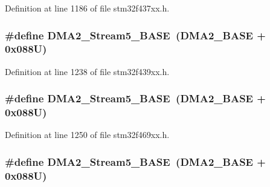 Definition at line 1186 of file stm32f437xx.\+h.

\subsubsection[{\texorpdfstring{D\+M\+A2\+\_\+\+Stream5\+\_\+\+B\+A\+SE}{DMA2_Stream5_BASE}}]{\setlength{\rightskip}{0pt plus 5cm}\#define D\+M\+A2\+\_\+\+Stream5\+\_\+\+B\+A\+SE~({\bf D\+M\+A2\+\_\+\+B\+A\+SE} + 0x088\+U)}\hypertarget{group___peripheral__memory__map_gaed1460fdc407b6decfbffccb0260d0af}{}\label{group___peripheral__memory__map_gaed1460fdc407b6decfbffccb0260d0af}


Definition at line 1238 of file stm32f439xx.\+h.

\subsubsection[{\texorpdfstring{D\+M\+A2\+\_\+\+Stream5\+\_\+\+B\+A\+SE}{DMA2_Stream5_BASE}}]{\setlength{\rightskip}{0pt plus 5cm}\#define D\+M\+A2\+\_\+\+Stream5\+\_\+\+B\+A\+SE~({\bf D\+M\+A2\+\_\+\+B\+A\+SE} + 0x088\+U)}\hypertarget{group___peripheral__memory__map_gaed1460fdc407b6decfbffccb0260d0af}{}\label{group___peripheral__memory__map_gaed1460fdc407b6decfbffccb0260d0af}


Definition at line 1250 of file stm32f469xx.\+h.

\subsubsection[{\texorpdfstring{D\+M\+A2\+\_\+\+Stream5\+\_\+\+B\+A\+SE}{DMA2_Stream5_BASE}}]{\setlength{\rightskip}{0pt plus 5cm}\#define D\+M\+A2\+\_\+\+Stream5\+\_\+\+B\+A\+SE~({\bf D\+M\+A2\+\_\+\+B\+A\+SE} + 0x088\+U)}\hypertarget{group___peripheral__memory__map_gaed1460fdc407b6decfbffccb0260d0af}{}\label{group___peripheral__memory__map_gaed1460fdc407b6decfbffccb0260d0af}


